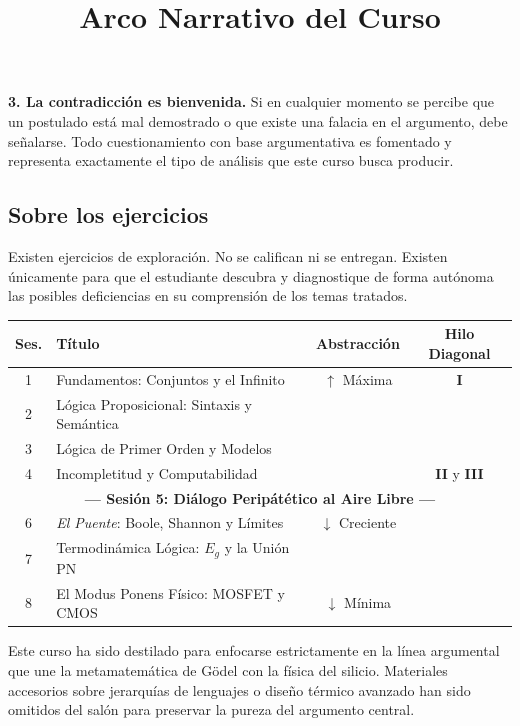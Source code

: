 \documentclass[11pt, letterpaper]{article}
\begin{document}
\textbf{3. La contradicci\'on es bienvenida.}
Si en cualquier momento se percibe que un postulado est\'a mal demostrado o que existe una falacia en el argumento, debe se\~nalarse. Todo cuestionamiento con base argumentativa es fomentado y representa exactamente el tipo de an\'alisis que este curso busca producir.

\subsection*{Sobre los ejercicios}
Existen ejercicios de exploraci\'on. No se califican ni se entregan. Existen \'unicamente para que el estudiante descubra y diagnostique de forma aut\'onoma las posibles deficiencias en su comprensi\'on de los temas tratados.

\newpage

\title{Arco Narrativo del Curso}

\begin{center}
\renewcommand{\arraystretch}{1.45}
\begin{tabular}{clcc}
\toprule
\textbf{Ses.} & \textbf{T\'itulo} & \textbf{Abstracci\'on} & \textbf{Hilo Diagonal} \\
\midrule
1  & Fundamentos: Conjuntos y el Infinito        & $\uparrow$ M\'axima & \textcolor{diagonalred}{\textbf{I}} \\
2  & L\'ogica Proposicional: Sintaxis y Sem\'antica & & \\
3  & L\'ogica de Primer Orden y Modelos          & & \\
4  & Incompletitud y Computabilidad              & & \textcolor{diagonalred}{\textbf{II} y \textbf{III}} \\
\midrule
\multicolumn{4}{c}{\textcolor{outdoorgreen}{\textbf{--- Sesi\'on 5: Di\'alogo Perip\'at\'etico al Aire Libre ---}}} \\
\midrule
6  & \textit{El Puente}: Boole, Shannon y L\'imites & $\downarrow$ Creciente & \\
7  & Termodin\'amica L\'ogica: $E_g$ y la Uni\'on PN & & \\
8  & El Modus Ponens F\'isico: MOSFET y CMOS     & $\downarrow$ M\'inima & \\
\bottomrule
\end{tabular}
\end{center}

\vspace{0.4em}
\begin{nota}
Este curso ha sido destilado para enfocarse estrictamente en la l\'inea argumental que une la metamatem\'atica de G\"odel con la f\'isica del silicio. Materiales accesorios sobre jerarqu\'ias de lenguajes o dise\~no t\'ermico avanzado han sido omitidos del sal\'on para preservar la pureza del argumento central.
\end{nota}
\end{document}
